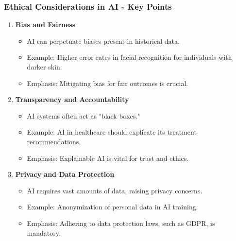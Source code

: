 \documentclass[aspectratio=169]{beamer}
\begin{document}
\begin{frame}[fragile]
    \frametitle{Ethical Considerations in AI - Key Points}
    \begin{enumerate}
        \item \textbf{Bias and Fairness}
            \begin{itemize}
                \item AI can perpetuate biases present in historical data.
                \item Example: Higher error rates in facial recognition for individuals with darker skin.
                \item Emphasis: Mitigating bias for fair outcomes is crucial.
            \end{itemize}
        
        \item \textbf{Transparency and Accountability}
            \begin{itemize}
                \item AI systems often act as "black boxes."
                \item Example: AI in healthcare should explicate its treatment recommendations.
                \item Emphasis: Explainable AI is vital for trust and ethics.
            \end{itemize}
        
        \item \textbf{Privacy and Data Protection}
            \begin{itemize}
                \item AI requires vast amounts of data, raising privacy concerns.
                \item Example: Anonymization of personal data in AI training.
                \item Emphasis: Adhering to data protection laws, such as GDPR, is mandatory.
            \end{itemize}
    \end{enumerate}
\end{frame}
\end{document}
